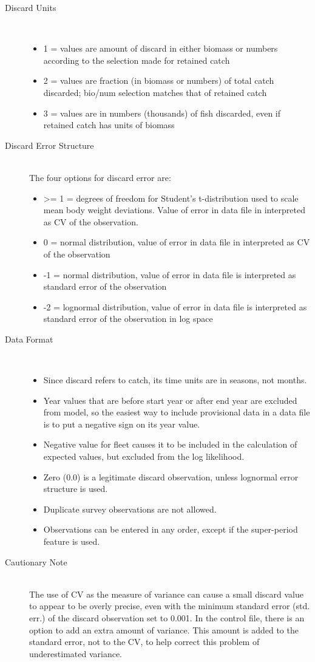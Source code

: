 \begin{description}
	\item[Discard Units]\ 
	\begin{itemize}
		\item 1 = values are amount of discard in either biomass or numbers according to the selection made for retained catch
		\item 2 = values are fraction (in biomass or numbers) of total catch discarded; bio/num selection matches that of retained catch
		\item 3 = values are in numbers (thousands) of fish discarded, even if retained catch has units of biomass
	\end{itemize}
	\item[Discard Error Structure]\hfill\\
	The four options for discard error are:
	\begin{itemize}
		\item >= 1 = degrees of freedom for Student's t-distribution used to scale mean body weight deviations.  Value of error in data file in interpreted as CV of the observation.
		\item 0 = normal distribution, value of error in data file in interpreted as CV of the observation
		\item -1 = normal distribution, value of error in data file is interpreted as standard error of the observation
		\item -2 = lognormal distribution, value of error in data file is interpreted as standard error of the observation in log space 
	\end{itemize}
	\item[Data Format]\
	\begin{itemize}
		\item Since discard refers to catch, its time units are in seasons, not months.
		\item Year values that are before start year or after end year are excluded from model, so the easiest way to include provisional data in a data file is to put a negative sign on its year value.
		\item Negative value for fleet causes it to be included in the calculation of expected values, but excluded from the log likelihood.
		\item Zero (0.0) is a legitimate discard observation, unless lognormal error structure is used.
		\item Duplicate survey observations are not allowed.
		\item Observations can be entered in any order, except if the super-period feature is used. 
	\end{itemize}
	\item[Cautionary Note]\hfill\\
	The use of CV as the measure of variance can cause a small discard value to appear to be overly precise, even with the minimum standard error (std. err.) of the discard observation set to 0.001.  In the control file, there is an option to add an extra amount of variance.  This amount is added to the standard error, not to the CV, to help correct this problem of underestimated variance.
\end{description}

